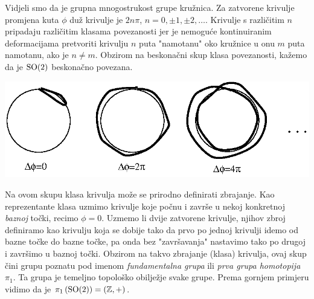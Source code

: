 \begin{primjer}[\SO{2}]
Vidjeli smo da je grupna
mnogostrukost grupe  kružnica.
Za zatvorene krivulje promjena kuta $\phi$ duž krivulje je $2n\pi$,
$n=0,\pm 1, \pm 2, \ldots$. Krivulje s različitim $n$ pripadaju
različitim klasama povezanosti jer je nemoguće kontinuiranim deformacijama
pretvoriti krivulju $n$ puta "namotanu" oko kružnice u onu $m$ puta namotanu,
ako je $n \neq m$. Obzirom na beskonačni skup klasa povezanosti,
kažemo da je $\mathrm{SO}(2)$ beskonačno povezana.

\centerline{\includegraphics[scale=1.0]{pics/homotopija.eps}}
\end{primjer}
Na ovom skupu klasa krivulja može se prirodno
definirati zbrajanje. Kao reprezentante klasa uzmimo
krivulje koje počnu i završe u nekoj konkretnoj \emph{baznoj} točki, recimo $\phi=0$.
Uzmemo li dvije zatvorene krivulje, njihov zbroj definiramo kao krivulju koja se dobije tako da 
prvo po jednoj krivulji idemo od bazne točke do bazne točke, pa onda
bez "završavanja" nastavimo tako po drugoj i završimo u baznoj točki.
Obzirom na takvo zbrajanje (klasa) krivulja, ovaj skup čini grupu
poznatu pod imenom \emph{fundamentalna grupa} ili \emph{prva grupa homotopija} $\pi_1$. 
Ta grupa je temeljno topološko obilježje svake grupe. Prema gornjem
primjeru vidimo da je $\pi_1\left(\mathrm{SO}(2) \right) = (\mathbb{Z}, +)$.

